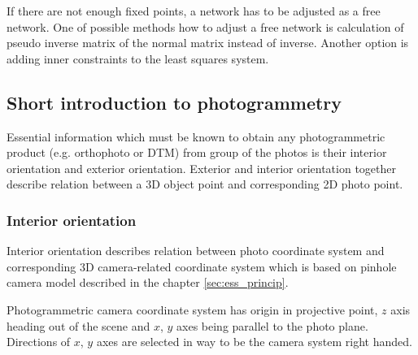 \documentclass[a4paper,12pt]{article}
\begin{document}
If there are not enough fixed points, a network has to be adjusted as a free network.
One of possible methods how to adjust a free network is calculation of pseudo inverse matrix of the normal matrix instead of
inverse. Another option is adding inner constraints to the least squares system.

\subsection{Short introduction to photogrammetry}

Essential information which must be known to obtain any photogrammetric
 product (e.g. orthophoto or DTM) from group of the photos is their interior orientation and exterior orientation.
Exterior and interior orientation together describe relation between a 3D object point and
corresponding 2D photo point.

\subsubsection{Interior orientation}

Interior orientation describes relation between photo coordinate system 
and corresponding 3D camera-related coordinate system which is based on pinhole camera model described in the chapter \ref{sec:ess_princip}.

Photogrammetric camera coordinate system has origin in projective point,
$z$ axis heading out of the scene  and $x$, $y$ axes being parallel to the photo plane. Directions of 
$x$, $y$ axes are selected in way to be the camera system right handed.
\end{document}

